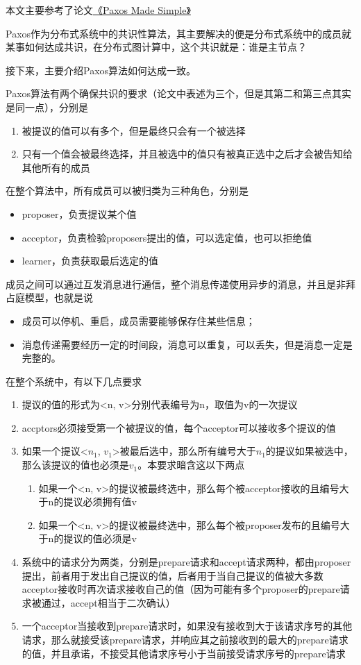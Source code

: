 \documentclass{article}
\begin{document}
本文主要参考了论文\href{https://lamport.azurewebsites.net/pubs/paxos-simple.pdf}{《Paxos Made Simple》}

Paxos作为分布式系统中的共识性算法，其主要解决的便是分布式系统中的成员就某事如何达成共识，在分布式图计算中，这个共识就是：谁是主节点？

接下来，主要介绍Paxos算法如何达成一致。

Paxos算法有两个确保共识的要求（论文中表述为三个，但是其第二和第三点其实是同一点），分别是
	\begin{enumerate}
		\item 被提议的值可以有多个，但是最终只会有一个被选择
		\item 只有一个值会被最终选择，并且被选中的值只有被真正选中之后才会被告知给其他所有的成员
	\end{enumerate}

在整个算法中，所有成员可以被归类为三种角色，分别是
	\begin{itemize}
		\item proposer，负责提议某个值
		\item acceptor，负责检验proposers提出的值，可以选定值，也可以拒绝值
		\item learner，负责获取最后选定的值
	\end{itemize}

成员之间可以通过互发消息进行通信，整个消息传递使用异步的消息，并且是非拜占庭模型，也就是说
	\begin{itemize}
		\item 成员可以停机、重启，成员需要能够保存住某些信息；
		\item 消息传递需要经历一定的时间段，消息可以重复，可以丢失，但是消息一定是完整的。
	\end{itemize}

	在整个系统中，有以下几点要求

	\begin{enumerate}
		\item 提议的值的形式为<n, v>分别代表编号为n，取值为v的一次提议
		\item accptors必须接受第一个被提议的值，每个acceptor可以接收多个提议的值
		\item 如果一个提议<$n_{1}$, $v_{1}$>被最后选中，那么所有编号大于$n_{1}$的提议如果被选中，那么该提议的值也必须是$v_{1}$。本要求暗含这以下两点
			\begin{enumerate}
				\item 如果一个<n, v>的提议被最终选中，那么每个被acceptor接收的且编号大于n的提议必须拥有值v
				\item 如果一个<n, v>的提议被最终选中，那么每个被proposer发布的且编号大于n的提议的值必须是v
			\end{enumerate}
		\item 系统中的请求分为两类，分别是prepare请求和accept请求两种，都由proposer提出，前者用于发出自己提议的值，后者用于当自己提议的值被大多数acceptor接收时再次请求接收自己的值（因为可能有多个proposer的prepare请求被通过，accept相当于二次确认）
		\item 一个acceptor当接收到prepare请求时，如果没有接收到大于该请求序号的其他请求，那么就接受该prepare请求，并响应其之前接收到的最大的prepare请求的值，并且承诺，不接受其他请求序号小于当前接受请求序号的prepare请求
	\end{enumerate}
\end{document}
